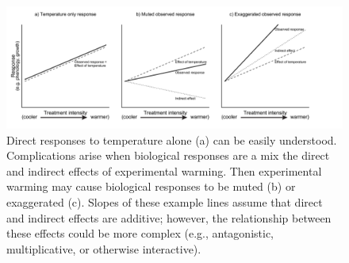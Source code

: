 \documentclass{article}
\begin{document}
 \clearpage
 \begin{figure}[h]
 \includegraphics{../Analyses/figures/DirIndWarmingEffects.pdf} 
 \caption{Direct responses to temperature alone (a) can be easily understood. Complications arise when biological responses are a mix the direct and indirect effects of experimental warming. Then experimental warming may cause biological responses to be muted (b) or exaggerated (c). Slopes of these example lines assume that direct and indirect effects are additive; however, the relationship between these effects could be more complex (e.g., antagonistic, multiplicative, or otherwise interactive).} 
\label{fig:biolimp}
  \end{figure}
\end{document}
